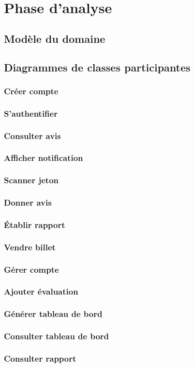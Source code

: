 \section[Phase d’analyse]{Phase d’analyse}
    \subsection[Modèle du domaine]{Modèle du domaine}
    \subsection[Diagrammes de classes participantes]{Diagrammes de classes participantes}
        \subsubsection[Créer compte]{Créer compte}
        \subsubsection[S’authentifier]{S’authentifier}
        \subsubsection[Consulter avis]{Consulter avis}
        \subsubsection[Afficher notification]{Afficher notification}
        \subsubsection[Scanner jeton]{Scanner jeton}
        \subsubsection[Donner avis]{Donner avis}
        \subsubsection[Établir rapport]{Établir rapport}
        \subsubsection[Vendre billet]{Vendre billet}
        \subsubsection[Gérer compte]{Gérer compte}
        \subsubsection[Ajouter évaluation]{Ajouter évaluation}
        \subsubsection[Générer tableau de bord]{Générer tableau de bord}
        \subsubsection[Consulter tableau de bord]{Consulter tableau de bord}
        \subsubsection[Consulter rapport]{Consulter rapport}